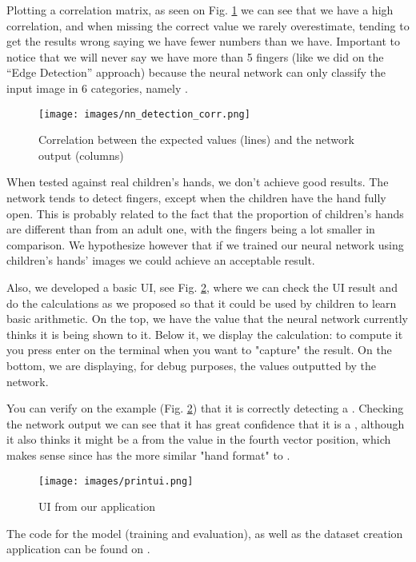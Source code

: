 \documentclass[conference]{IEEEtran}
\begin{document}
Plotting a correlation matrix, as seen on Fig. \ref{finnger_covariance} we can see that we have a high correlation, and when missing the correct value we rarely overestimate, tending to get the results wrong saying we have fewer numbers than we have. Important to notice that we will never say we have more than 5 fingers (like we did on the ``Edge Detection'' approach) because the neural network can only classify the input image in 6 categories, namely .

\begin{figure}[htbp]
\centerline{\texttt{[image: images/nn\_detection\_corr.png]}}
\caption{Correlation between the expected values (lines) and the network output (columns)}
\label{finnger_covariance}
\end{figure}

When tested against real children's hands, we don't achieve good results. The network tends to detect  fingers, except when the children have the hand fully open. This is probably related to the fact that the proportion of children's hands are different than from an adult one, with the fingers being a lot smaller in comparison. We hypothesize however that if we trained our neural network using children's hands' images we could achieve an acceptable result.

Also, we developed a basic UI, see Fig. \ref{app_ui}, where we can check the UI result and do the calculations as we proposed so that it could be used by children to learn basic arithmetic. On the top, we have the value that the neural network currently thinks it is being shown to it. Below it, we display the calculation: to compute it you press enter on the terminal when you want to "capture" the result. On the bottom, we are displaying, for debug purposes, the values outputted by the network.

You can verify on the example (Fig. \ref{app_ui}) that it is correctly detecting a . Checking the network output we can see that it has great confidence that it is a , although it also thinks it might be a  from the value in the fourth vector position, which makes sense since  has the more similar "hand format" to .

\begin{figure}[htbp]
\centerline{\texttt{[image: images/printui.png]}}
\caption{UI from our application}
\label{app_ui}
\end{figure}

The code for the model (training and evaluation), as well as the dataset creation application can be found on \cite{github_code}.
\end{document}
